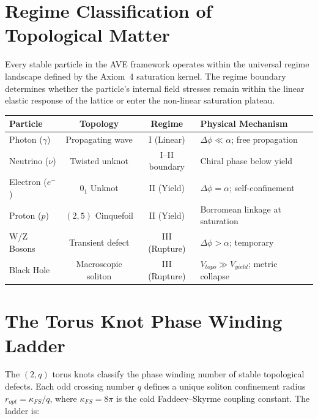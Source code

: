 \section{Regime Classification of Topological Matter}

Every stable particle in the AVE framework operates within the universal regime landscape defined by the Axiom~4 saturation kernel. The regime boundary determines whether the particle's internal field stresses remain within the linear elastic response of the lattice or enter the non-linear saturation plateau.

\begin{center}
\small
\renewcommand{\arraystretch}{1.2}
\begin{tabular}{lccl}
\toprule
\textbf{Particle} & \textbf{Topology} & \textbf{Regime} & \textbf{Physical Mechanism} \\
\midrule
Photon ($\gamma$)          & Propagating wave    & I (Linear)    & $\Delta\phi \ll \alpha$; free propagation \\
Neutrino ($\nu$)           & Twisted unknot      & I--II boundary & Chiral phase below yield \\
Electron ($e^-$)           & $0_1$ Unknot         & II (Yield)    & $\Delta\phi = \alpha$; self-confinement \\
Proton ($p$)               & $(2,5)$ Cinquefoil   & II (Yield)    & Borromean linkage at saturation \\
W/Z Bosons                 & Transient defect     & III (Rupture)  & $\Delta\phi > \alpha$; temporary \\
Black Hole                 & Macroscopic soliton  & III (Rupture)  & $V_{topo} \gg V_{yield}$; metric collapse \\
\bottomrule
\end{tabular}
\end{center}

\section{The Torus Knot Phase Winding Ladder}

The $(2,q)$ torus knots classify the phase winding number of stable topological defects. Each odd crossing number $q$ defines a unique soliton confinement radius $r_{opt} = \kappa_{FS} / q$, where $\kappa_{FS} = 8\pi$ is the cold Faddeev--Skyrme coupling constant. The ladder is:

